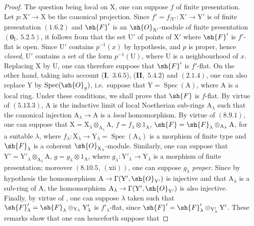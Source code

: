 \begin{proof}
The question being local on $\mathrm{X}$, one can suppose $f$ of finite presentation. Let
$p:\mathrm{X}'\to\mathrm{X}$ be the canonical projection. Since
$f'=f_{|\mathrm{Y}'}:\mathrm{X}'\to\mathrm{Y}'$ is of finite presentation
$(1.6.2)$ and $\sh{F}'$ is an $\sh{O}_{\mathrm{X}'}$-module of finite presentation $(\mathbf{0}_\mathrm{I},~5.2.5)$, it follows
from  that the set $\mathrm{U}'$ of points of $\mathrm{X}'$ where $\sh{F}'$ is $f'$-flat is open. Since $\mathrm{U}'$
contains $p^{-1}(x)$ by hypothesis, and $p$ is proper, hence \emph{closed}, $\mathrm{U}'$ contains a set of the form
$p^{-1}(\mathrm{U})$, where $\mathrm{U}$ is a neighbourhood of $x$. Replacing $\mathrm{X}$ by $\mathrm{U}$, one can therefore
suppose that $\sh{F}'$ is $f'$-flat. On the other hand, taking into account (\textbf{I},~$3.6.5$), (\textbf{II},~$5.4.2$)
and $(2.1.4)$, one can also replace $\mathrm{Y}$ by $\operatorname{Spec}(\sh{O}_y)$, i.e.\ suppose that $\mathrm{Y}=\operatorname{Spec}(\mathrm{A})$,
where $\mathrm{A}$ is a local ring. Under these conditions, we shall prove that $\sh{F}$ is $f$-flat. By virtue
of $(5.13.3)$, $\mathrm{A}$ is the inductive limit of local Noetherian sub-rings $\mathrm{A}_\lambda$ such that
the canonical injection $\mathrm{A}_\lambda\to\mathrm{A}$ is a \emph{local} homomorphism. By virtue of $(8.9.1)$, one
can suppose that $\mathrm{X}=\mathrm{X}_\lambda\otimes_{\mathrm{A}_\lambda}\mathrm{A}$, $f=f_\lambda\otimes 1_\mathrm{A}$, $\sh{F}=\sh{F}_\lambda\otimes_{\mathrm{A}_\lambda}\mathrm{A}$,
for a suitable $\lambda$, where $f_\lambda:\mathrm{X}_\lambda\to\mathrm{Y}_\lambda=\operatorname{Spec}(\mathrm{A}_\lambda)$ is a morphism of finite type and
$\sh{F}_\lambda$ is a coherent $\sh{O}_{\mathrm{X}_\lambda}$-module.
Similarly, one can suppose that $\mathrm{Y}'=\mathrm{Y}'_\lambda\otimes_{\mathrm{A}_\lambda}\mathrm{A}$, $g=g_\lambda\otimes 1_\mathrm{A}$, where $g_\lambda:\mathrm{Y}'_\lambda\to\mathrm{Y}_\lambda$ is a
morphism of finite presentation; moreover $(8.10.5,~(\text{xii}))$, one can suppose $g_\lambda$
\emph{proper}. Since by hypothesis the homomorphism $\mathrm{A}\to\Gamma(\mathrm{Y}',\sh{O}_{\mathrm{Y}'})$ is injective and that $\mathrm{A}_\lambda$
is a sub-ring of $\mathrm{A}$, the homomorphism $\mathrm{A}_\lambda\to\Gamma(\mathrm{Y}',\sh{O}_{\mathrm{Y}'})$ is also injective. Finally,
by virtue of , one can suppose $\lambda$ taken such that $\sh{F}'_\lambda=\sh{F}_\lambda\otimes_{\mathrm{Y}_\lambda}\mathrm{Y}'_\lambda$ is $f'_\lambda$-flat,
since $\sh{F}'=\sh{F}'_\lambda\otimes_{\mathrm{Y}'_\lambda}\mathrm{Y}'$. These remarks show that one can henceforth suppose that

\end{proof}
